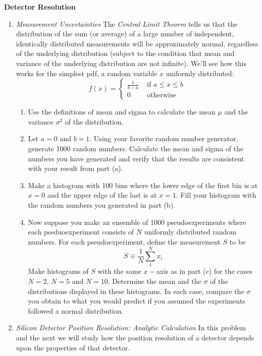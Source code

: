 \documentclass[12pt]{article}
\begin{document}
\begin{center}
  {\large\bf Detector Resolution}
\end{center}
\vskip0.2in
\begin{enumerate}
\item {\it Measurement Uncertainties} 
The {\it Central Limit Theorm} tells us  that 
the distribution of the sum (or average) of a large number of independent, identically 
distributed measurements will be approximately normal, regardless of the underlying distribution
(subject to the condition that mean and variance of the underlying distribution are not infinite).
We'll see how this works for the simplest pdf, a random variable $x$ uniformly distributed:
$$
f(x) = 
\left\{ \begin{array}{rl}
 \frac{1}{b-a} &\mbox{ if $a \le x \le b$} \\
  0 &\mbox{ otherwise}
       \end{array} 
\right.
$$ 
\begin{enumerate}
\item Use the definitions of mean and sigma to
calculate the mean $\mu$ and the variance $\sigma^2$ of the distribution.
\item Let $a=0$ and $b=1$. Using your favorite random number generator, generate 1000 random numbers.  Calculate the
  mean and sigma of the numbers you have generated
  and verify that the results are consistent with your result from  part (a). 
\item Make a histogram  with 100 bins where the lower edge of the first bin is at $x=0$ and the upper
edge of the last is at $x=1$.  Fill your histogram with the random numbers you generated in part (b).  
\item Now suppose you make an ensemble of 1000 pseudoexperiments where each pseduoexperiment consists of $N$
uniformly distributed random numbers.  For each pseudoexperiment, define the measurement $S$ to be
$$
S \equiv \frac{1}{N} \sum_1^N x_i
$$
Make histograms of $S$ with the same $x-$axis as in part (c) for the cases $N=2$, $N=5$
and $N=10$.  Determine the mean and the $\sigma$ of the distributions displayed in
these histograms.  In each case, compare the
$\sigma$ you obtain to what you would predict if you assumed the experiments followed a normal distribution.
\end{enumerate}
\item {\it Silicon Detector Position Resolution:  Analytic Calculation}
In this problem and the next we will study
how the position resolution of a detector
depends upon the properties of that detector.  

\end{enumerate}
\end{document}
